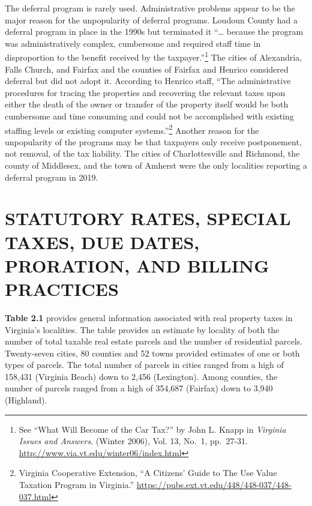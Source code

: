 \documentclass[
]{book}
\begin{document}
The deferral program is rarely used. Administrative problems appear to be the major reason for the unpopularity of deferral programs. Loudoun County had a deferral program in place in the 1990s but terminated it ``\ldots{} because the program was administratively complex, cumbersome and required staff time in disproportion to the benefit received by the taxpayer.''\footnote{See ``What Will Become of the Car Tax?'' by John L. Knapp in \emph{Virginia Issues and Answers}. (Winter 2006), Vol. 13, No.~1, pp.~27-31.
  \url{http://www.via.vt.edu/winter06/index.html}} The cities of Alexandria, Falls Church, and Fairfax and the counties of Fairfax and Henrico considered deferral but did not adopt it. According to Henrico staff, ``The administrative procedures for tracing the properties and recovering the relevant taxes upon either the death of the owner or transfer of the property itself would be both cumbersome and time consuming and could not be accomplished with existing staffing levels or existing computer systems.''\footnote{Virginia Cooperative Extension, ``A Citizens' Guide to The Use Value Taxation Program in Virginia.'' \url{https://pubs.ext.vt.edu/448/448-037/448-037.html}} Another reason for the unpopularity of the programs may be that taxpayers only receive postponement, not removal, of the tax liability. The cities of Charlottesville and Richmond, the county of Middlesex, and the town of Amherst were the only localities reporting a deferral program in 2019.

\hypertarget{statutory-rates-special-taxes-due-dates-proration-and-billing-practices}{%
\section{STATUTORY RATES, SPECIAL TAXES, DUE DATES, PRORATION, AND BILLING PRACTICES}\label{statutory-rates-special-taxes-due-dates-proration-and-billing-practices}}

\textbf{Table 2.1} provides general information associated with real property taxes in Virginia's localities. The table provides an estimate by locality of both the number of total taxable real estate parcels and the number of residential parcels. Twenty-seven cities, 80 counties and 52 towns provided estimates of one or both types of parcels. The total number of parcels in cities ranged from a high of 158,431 (Virginia Beach) down to 2,456 (Lexington). Among counties, the number of parcels ranged from a high of 354,687 (Fairfax) down to 3,940 (Highland).
\end{document}
